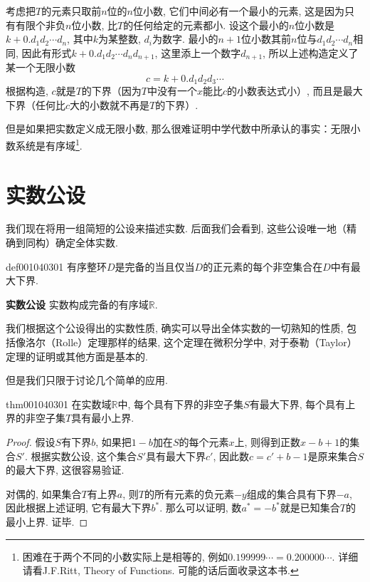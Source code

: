 考虑把$T$的元素只取前$n$位的$n$位小数, 它们中间必有一个最小的元素, 这是因为只有有限个非负$n$位小数, 比$T$的任何给定的元素都小. 设这个最小的$n$位小数是$k+0.d_1d_2\cdots{}d_n$, 其中$k$为某整数, $d_i$为数字. 最小的$n+1$位小数其前$n$位与$d_1d_2\cdots{}d_n$相同, 因此有形式$k+0.d_1d_2\cdots{}d_nd_{n+1}$, 这里添上一个数字$d_{n+1}$, 所以上述构造定义了某一个无限小数
\[
c = k + 0.d_1d_2d_3\cdots
\]
根据构造, $c$就是$T$的下界（因为$T$中没有一个$x$能比$c$的小数表达式小）, 而且是最大下界（任何比$c$大的小数就不再是$T$的下界）. 

但是如果把实数定义成无限小数, 那么很难证明中学代数中所承认的事实：无限小数系统是有序域\footnote{困难在于两个不同的小数实际上是相等的, 例如$0.199999\cdots=0.200000\cdots$. 详细请看J.F.Ritt, Theory of Functions. 可能的话后面收录这本书. }. 



\section{实数公设}\label{subsection0010403}
我们现在将用一组简短的公设来描述实数. 后面我们会看到, 这些公设唯一地（精确到同构）确定全体实数. 

\begin{definition}{}{def001040301}
有序整环$D$是完备的当且仅当$D$的正元素的每个非空集合在$D$中有最大下界. 
\end{definition}

\textbf{实数公设} \quad 实数构成完备的有序域$\mathbb{R}$. 

我们根据这个公设得出的实数性质, 确实可以导出全体实数的一切熟知的性质, 包括像洛尔（Rolle）定理那样的结果, 这个定理在微积分学中, 对于泰勒（Taylor）定理的证明或其他方面是基本的. 

但是我们只限于讨论几个简单的应用. 
\begin{theorem}{}{thm001040301}
在实数域$\mathbb{R}$中, 每个具有下界的非空子集$S$有最大下界, 每个具有上界的非空子集$T$具有最小上界. 
\end{theorem}

\begin{proof}
假设$S$有下界$b$, 如果把$1-b$加在$S$的每个元素$x$上, 则得到正数$x-b+1$的集合$S'$. 根据实数公设, 这个集合$S'$具有最大下界$c'$, 因此数$c=c'+b-1$是原来集合$S$的最大下界, 这很容易验证. 

对偶的, 如果集合$T$有上界$a$, 则$T$的所有元素的负元素$-y$组成的集合具有下界$-a$, 因此根据上述证明, 它有最大下界$b^*$. 那么可以证明, 数$a^*=-b^*$就是已知集合$T$的最小上界. 证毕. 
\end{proof}

